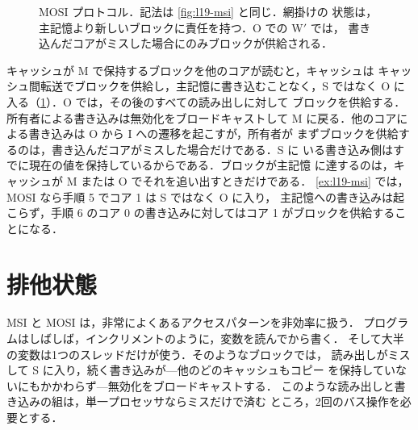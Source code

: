 \documentclass[../main.tex]{subfiles}
\begin{document}
\begin{figure}[htbp]
  \centering
  
  \caption{MOSI プロトコル．記法は \cref{fig:l19-msi} と同じ．網掛けの
    状態は，主記憶より新しいブロックに責任を持つ．O での W$'$ では，
    書き込んだコアがミスした場合にのみブロックが供給される．}
  \label{fig:l19-mosi}
\end{figure}

キャッシュが M で保持するブロックを他のコアが読むと，キャッシュは
キャッシュ間転送でブロックを供給し，主記憶に書き込むことなく，S ではなく
O に入る（\cref{fig:l19-mosi}）．O では，その後のすべての読み出しに対して
ブロックを供給する．所有者による書き込みは無効化をブロードキャストして M
に戻る．他のコアによる書き込みは O から I への遷移を起こすが，所有者が
まずブロックを供給するのは，書き込んだコアがミスした場合だけである．S に
いる書き込み側はすでに現在の値を保持しているからである．ブロックが主記憶
に達するのは，キャッシュが M または O でそれを追い出すときだけである．
\cref{ex:l19-msi} では，MOSI なら手順 5 でコア 1 は S ではなく O に入り，
主記憶への書き込みは起こらず，手順 6 のコア 0 の書き込みに対してはコア 1
がブロックを供給することになる．

\section{排他状態}
\label{sec:l19-mesi}

MSI と MOSI は，非常によくあるアクセスパターンを非効率に扱う．
プログラムはしばしば，インクリメントのように，変数を読んでから書く．
そして大半の変数は1つのスレッドだけが使う．そのようなブロックでは，
読み出しがミスして S に入り，続く書き込みが---他のどのキャッシュもコピー
を保持していないにもかかわらず---無効化をブロードキャストする．
このような読み出しと書き込みの組は，単一プロセッサならミスだけで済む
ところ，2回のバス操作を必要とする．
\end{document}
